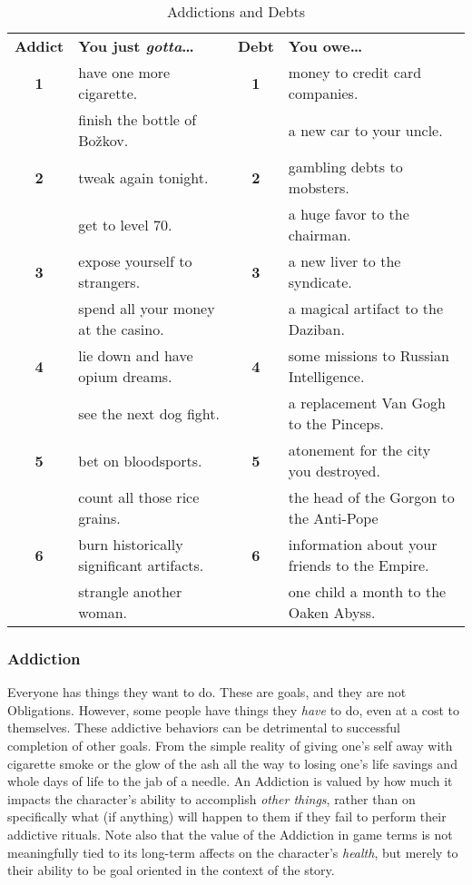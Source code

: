 \begin{table}[htb]\center
\caption{Addictions and Debts} 
\begin{tabular}{c p{6.5cm} c p{7cm}}
\textbf{Addict} & \textbf{You just \textit{gotta}\ldots{}}&\textbf{Debt} & \textbf{You owe\ldots{}}\\
\textbf{1}  &   have one more cigarette.&\textbf{1}  &   money to credit card companies.\\
& finish the bottle of Bo\v{z}kov.&&a new car to your uncle.\\
\textbf{2}  &   tweak again tonight.&\textbf{2}  &   gambling debts to mobsters.\\
& get to level 70.&&a huge favor to the chairman.\\
\textbf{3}  &   expose yourself to strangers.&\textbf{3}  &   a new liver to the syndicate.\\
& spend all your money at the casino.&&a magical artifact to the Daziban.\\
\textbf{4}  &   lie down and have opium dreams.&\textbf{4}  &   some missions to Russian Intelligence.\\
& see the next dog fight.&&a replacement Van Gogh to the Pinceps.\\
\textbf{5}  &   bet on bloodsports.&\textbf{5}  &    atonement for the city you destroyed.\\
& count all those rice grains.&&the head of the Gorgon to the Anti-Pope\\
\textbf{6}  &   burn historically significant artifacts.&\textbf{6}  &    information about your friends to the Empire.\\
& strangle another woman.&& one child a month to the Oaken Abyss.\\
\end{tabular}
\end{table}

\subsubsection{Addiction}

\hspace{\parindent} Everyone has things they want to do. These are goals, and they are not Obligations. However, some people have things they \textit{have} to do, even at a cost to themselves. These addictive behaviors can be detrimental to successful completion of other goals. From the simple reality of giving one's self away with cigarette smoke or the glow of the ash all the way to losing one's life savings and whole days of life to the jab of a needle. An Addiction is valued by how much it impacts the character's ability to accomplish \textit{other things}, rather than on specifically what (if anything) will happen to them if they fail to perform their addictive rituals. Note also that the value of the Addiction in game terms is not meaningfully tied to its long-term affects on the character's \textit{health}, but merely to their ability to be goal oriented in the context of the story.

